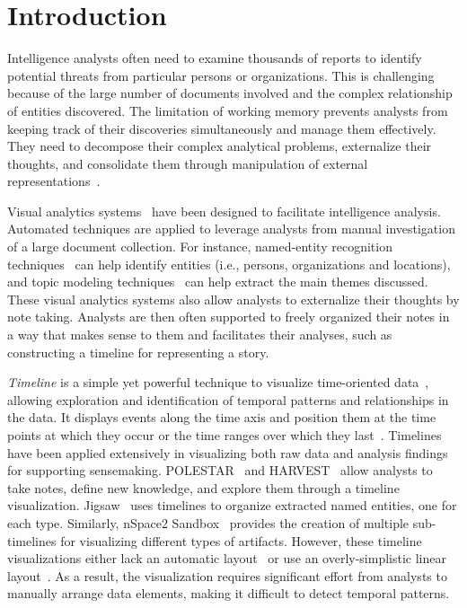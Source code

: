 \section{Introduction}
Intelligence analysts often need to examine thousands of reports to identify potential threats from particular persons or organizations. This is challenging because of the large number of documents involved and the complex relationship of entities discovered. The limitation of working memory prevents analysts from keeping track of their discoveries simultaneously and manage them effectively. They need to decompose their complex analytical problems, externalize their thoughts, and consolidate them through manipulation of external representations~\cite{Heuer1999}.

Visual analytics systems~\cite{Pioch2006,Wright2006,Stasko2007} have been designed to facilitate intelligence analysis. Automated techniques are applied to leverage analysts from manual investigation of a large document collection. For instance, named-entity recognition techniques~\cite{Nadeau2007} can help identify entities (i.e., persons, organizations and locations), and topic modeling techniques~\cite{Blei2003} can help extract the main themes discussed. These visual analytics systems also allow analysts to externalize their thoughts by note taking. Analysts are then often supported to freely organized their notes in a way that makes sense to them and facilitates their analyses, such as constructing a timeline for representing a story.

\emph{Timeline} is a simple yet powerful technique to visualize time-oriented data~\cite{Tufte1983}, allowing exploration and identification of temporal patterns and relationships in the data. It displays events along the time axis and position them at the time points at which they occur or the time ranges over which they last~\cite{Plaisant1996}. Timelines have been applied extensively in visualizing both raw data and analysis findings for supporting sensemaking. POLESTAR~\cite{Pioch2006} and HARVEST~\cite{Gotz2006} allow analysts to take notes, define new knowledge, and explore them through a timeline visualization. Jigsaw~\cite{Gorg2013} uses timelines to organize extracted named entities, one for each type. Similarly, nSpace2 Sandbox~\cite{SandboxTimeline2012} provides the creation of multiple sub-timelines for visualizing different types of artifacts. However, these timeline visualizations either lack an automatic layout~\cite{Pioch2006} or use an overly-simplistic linear layout~\cite{SandboxTimeline2012}. As a result, the visualization requires significant effort from analysts to manually arrange data elements, making it difficult to detect temporal patterns.

